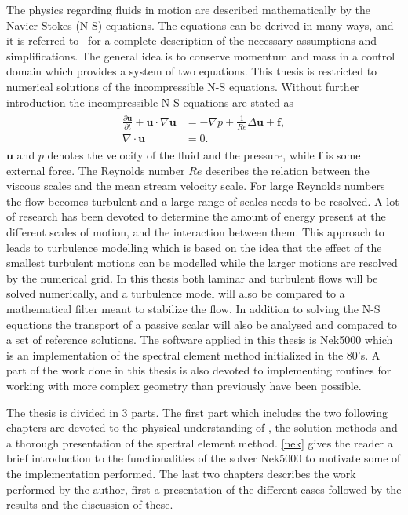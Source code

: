 The physics regarding fluids in motion are described mathematically by the Navier-Stokes (N-S) equations. 
The equations can be derived in many ways, and it is referred to~\cite{White} for a complete 
description of the necessary assumptions and simplifications.
The general idea is to conserve momentum and mass in a control domain which provides a system of two equations.
This thesis is restricted to numerical solutions of the incompressible N-S equations.
Without further introduction the incompressible N-S equations are stated as  
%
\begin{align}
    \begin{split}
    \frac{\partial \mathbf{u}}{\partial t} + \mathbf{u}\cdot \nabla\mathbf{u} &= 
    -\nabla p + \frac{1}{Re} \Delta\mathbf{u} + \mathbf{f}, \\
		\nabla \cdot \mathbf{u} &= 0.
    \end{split}
	\label{eq:NS}
\end{align}
%
$\mathbf{u}$ and $p$ denotes the velocity of the fluid and the pressure, while $\mathbf{f}$ is some external force. 
The Reynolds number $Re$ describes the relation between the viscous scales and the mean stream velocity scale.
For large Reynolds numbers the flow becomes turbulent and a large range of scales needs to be resolved. A lot 
of research has been devoted to determine the amount of energy present at the different scales of motion, and 
the interaction between them. This approach to  leads to turbulence modelling which is based on the 
idea that the effect of the smallest turbulent motions can be modelled while the larger motions are resolved by 
the numerical grid. 
In this thesis both laminar and turbulent flows will be solved numerically, and a turbulence model will also 
be compared to a mathematical filter meant to stabilize the flow. In addition to solving the N-S equations the 
transport of a passive scalar will also be analysed and compared to a set of reference solutions. 
The software applied in this thesis is Nek5000 which is an implementation of the spectral element method initialized in the 80's.
A part of the work done in this thesis is also devoted to implementing routines for working with more complex geometry than previously 
have been possible. 

The thesis is divided in 3 parts. The first part which includes the two following chapters are devoted to the physical understanding 
of , the solution methods and a thorough presentation of the spectral element method. \cref{nek} gives the reader a brief 
introduction to the functionalities of the solver Nek5000 to motivate some of the implementation performed. The last two chapters 
describes the work performed by the author, first a presentation of the different cases followed by the results and the discussion
of these.

